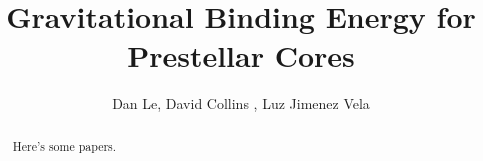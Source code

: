 \title{Gravitational Binding Energy for Prestellar Cores}
\author{Dan Le, David Collins
, Luz Jimenez Vela }



\begin{abstract}
    Here's some papers.
\end{abstract}

